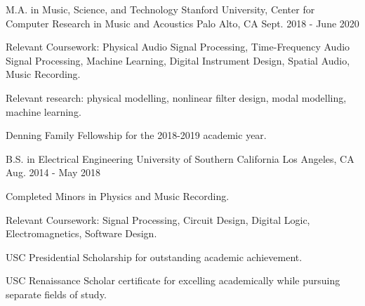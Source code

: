 

\begin{cventries}

    \cventry
    {M.A. in Music, Science, and Technology} %
    {Stanford University, Center for Computer Research in Music and Acoustics} %
    {Palo Alto, CA} %
    {Sept. 2018 - June 2020} %
    {
      \begin{cvitems} %
        \item {Relevant Coursework: Physical Audio Signal Processing, Time-Frequency Audio Signal Processing,
        Machine Learning, Digital Instrument Design, Spatial Audio, Music Recording.}
        \item {Relevant research: physical modelling, nonlinear filter design,
        modal modelling, machine learning.}
        \item {Denning Family Fellowship for the 2018-2019 academic year.}
      \end{cvitems}
    }

    \cventry
    {B.S. in Electrical Engineering} %
    {University of Southern California} %
    {Los Angeles, CA} %
    {Aug. 2014 - May 2018} %
    {
      \begin{cvitems} %
        \item {Completed Minors in Physics and Music Recording.}
        \item {Relevant Coursework: Signal Processing, Circuit Design, Digital Logic, Electromagnetics, Software Design.}
        \item {USC Presidential Scholarship for outstanding academic achievement.}
        \item {USC Renaissance Scholar certificate for excelling academically while pursuing separate fields of study.}
      \end{cvitems}
    }

\end{cventries}

